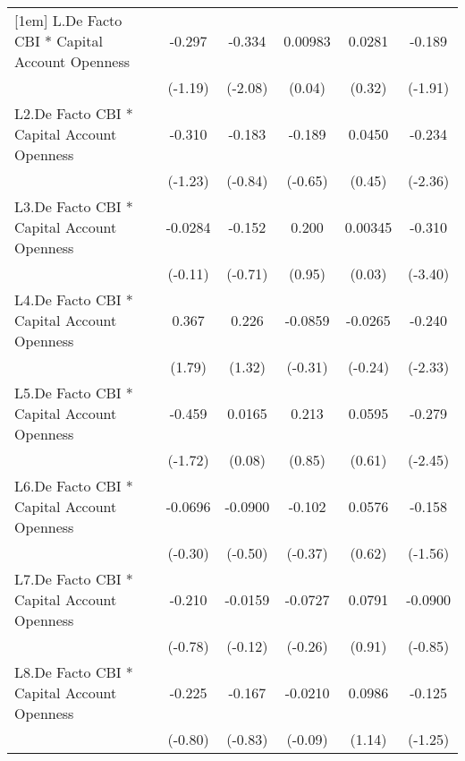 {\begin{longtable}{l*{5}{c}}
[1em]
L.De Facto CBI * Capital Account Openness&   -0.297         &   -0.334\sym{*}  &  0.00983         &   0.0281         &   -0.189         \\
                &  (-1.19)         &  (-2.08)         &   (0.04)         &   (0.32)         &  (-1.91)         \\
[1em]
L2.De Facto CBI * Capital Account Openness&   -0.310         &   -0.183         &   -0.189         &   0.0450         &   -0.234\sym{*}  \\
                &  (-1.23)         &  (-0.84)         &  (-0.65)         &   (0.45)         &  (-2.36)         \\
[1em]
L3.De Facto CBI * Capital Account Openness&  -0.0284         &   -0.152         &    0.200         &  0.00345         &   -0.310\sym{***}\\
                &  (-0.11)         &  (-0.71)         &   (0.95)         &   (0.03)         &  (-3.40)         \\
[1em]
L4.De Facto CBI * Capital Account Openness&    0.367         &    0.226         &  -0.0859         &  -0.0265         &   -0.240\sym{*}  \\
                &   (1.79)         &   (1.32)         &  (-0.31)         &  (-0.24)         &  (-2.33)         \\
[1em]
L5.De Facto CBI * Capital Account Openness&   -0.459         &   0.0165         &    0.213         &   0.0595         &   -0.279\sym{*}  \\
                &  (-1.72)         &   (0.08)         &   (0.85)         &   (0.61)         &  (-2.45)         \\
[1em]
L6.De Facto CBI * Capital Account Openness&  -0.0696         &  -0.0900         &   -0.102         &   0.0576         &   -0.158         \\
                &  (-0.30)         &  (-0.50)         &  (-0.37)         &   (0.62)         &  (-1.56)         \\
[1em]
L7.De Facto CBI * Capital Account Openness&   -0.210         &  -0.0159         &  -0.0727         &   0.0791         &  -0.0900         \\
                &  (-0.78)         &  (-0.12)         &  (-0.26)         &   (0.91)         &  (-0.85)         \\
[1em]
L8.De Facto CBI * Capital Account Openness&   -0.225         &   -0.167         &  -0.0210         &   0.0986         &   -0.125         \\
                &  (-0.80)         &  (-0.83)         &  (-0.09)         &   (1.14)         &  (-1.25)         \\

\end{longtable}}
